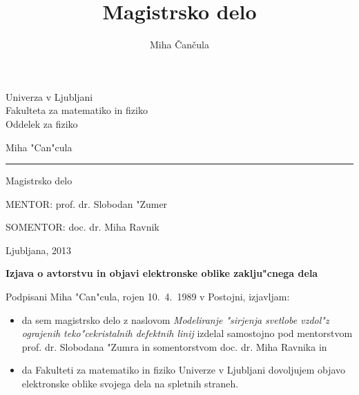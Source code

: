 \documentclass[12pt,twoside,openright,final]{report}
\title{Magistrsko delo}
\author{Miha \v Can\v cula}
\begin{document}
\thispagestyle{empty}
\begin{center}
{\Large\sc Univerza v Ljubljani \\
\medskip
Fakulteta za matematiko in fiziko\\
\medskip
Oddelek za fiziko}\\

\vfill

\bigskip\bigskip\bigskip\bigskip\bigskip\bigskip\bigskip\bigskip
\bigskip\bigskip\bigskip

{\Large Miha "Can"cula}\\

\bigskip\bigskip\bigskip

{\LARGE{}}

\bigskip

{\LARGE{}}

\vskip 8mm \hrule height0.5mm \vskip 12mm


{\Large Magistrsko delo}\\

\bigskip\bigskip\bigskip\bigskip\bigskip\bigskip\bigskip\bigskip\bigskip\bigskip\bigskip\bigskip\bigskip\bigskip\bigskip

{\Large MENTOR: prof. dr. Slobodan "Zumer}\\ \smallskip\smallskip\smallskip

{\Large SOMENTOR: doc. dr. Miha Ravnik}

\bigskip\bigskip

\vfill
{\Large Ljubljana, 2013}
\end{center}

\newpage

\newpage

\thispagestyle{empty}

\centerline{}

\vfill

\centerline{\bf Izjava o avtorstvu in objavi elektronske oblike zaklju"cnega dela}
\bigskip\bigskip
\noindent


Podpisani Miha "Can"cula, rojen 10.~4.~1989 v Postojni, izjavljam:

\begin{itemize}
 \item da sem magistrsko delo z naslovom \emph{Modeliranje "sirjenja svetlobe vzdol"z ograjenih teko"cekristalnih defektnih linij} izdelal samostojno pod mentorstvom prof. dr. Slobodana "Zumra in somentorstvom doc. dr. Miha Ravnika in
 \item da Fakulteti za matematiko in fiziko Univerze v Ljubljani dovoljujem objavo \\ elektronske oblike svojega dela na spletnih straneh. 
\end{itemize}
 
\end{document}
